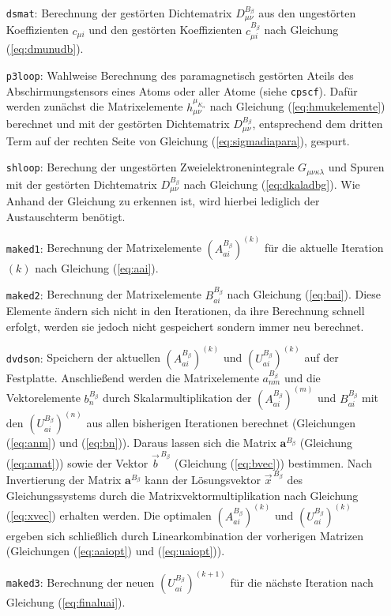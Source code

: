 \begin{itemize}[leftmargin=60pt]
\item[\texttt{dsmat}:] Berechnung der gestörten Dichtematrix $D_{\mu\nu}^{B_\beta}$ aus den ungestörten Koeffizienten $c_{\mu i}$ und den gestörten Koeffizienten $c_{\mu i}^{B_\beta}$ nach Gleichung (\ref{eq:dmunudb}).
\item[\texttt{p3loop}:] Wahlweise Berechnung des paramagnetisch gestörten Ateils des Abschirmungstensors eines Atoms oder aller Atome (siehe \texttt{cpscf}). Dafür werden zunächst die Matrixelemente $h_{\mu\nu}^{\mu_{K_\alpha}}$ nach Gleichung (\ref{eq:hmukelemente}) berechnet und mit der gestörten Dichtematrix $D_{\mu\nu}^{B_\beta}$, entsprechend dem dritten Term auf der rechten Seite von Gleichung (\ref{eq:sigmadiapara}), gespurt.
\item[\texttt{shloop}:] Berechung der ungestörten Zweielektronenintegrale $G_{\mu\nu\kappa\lambda}$ und Spuren mit der gestörten Dichtematrix $D_{\mu\nu}^{B_\beta}$ nach Gleichung (\ref{eq:dkaladbg}). Wie Anhand der Gleichung zu erkennen ist, wird hierbei lediglich der Austauschterm benötigt.
\item[\texttt{maked1}:] Berechnung der Matrixelemente $\left(A_{ai}^{B_\beta}\right)^{(k)}$ für die aktuelle Iteration $(k)$ nach Gleichung (\ref{eq:aai}).
\item[\texttt{maked2}:] Berechnung der Matrixelemente $B_{ai}^{B_\beta}$ nach Gleichung (\ref{eq:bai}). Diese Elemente ändern sich nicht in den Iterationen, da ihre Berechnung schnell erfolgt, werden sie jedoch nicht gespeichert sondern immer neu berechnet. 
\item[\texttt{dvdson}:] Speichern der aktuellen $\left(A_{ai}^{B_\beta}\right)^{(k)}$ und $\left(U_{ai}^{B_\beta}\right)^{(k)}$ auf der Festplatte. Anschließend werden die Matrixelemente $a_{nm}^{B_\beta}$ und die Vektorelemente $b_{n}^{B_\beta}$ durch Skalarmultiplikation der $\left(A_{ai}^{B_\beta}\right)^{(m)}$ und $B_{ai}^{B_\beta}$ mit den $\left(U_{ai}^{B_\beta}\right)^{(n)}$ aus allen bisherigen Iterationen berechnet (Gleichungen (\ref{eq:anm}) und (\ref{eq:bn})). Daraus lassen sich die Matrix $\boldsymbol{a}^{B_\beta}$ (Gleichung (\ref{eq:amat})) sowie der Vektor $\vec{b}^{\,B_\beta}$ (Gleichung (\ref{eq:bvec})) bestimmen. Nach Invertierung der Matrix $\boldsymbol{a}^{B_\beta}$ kann der Lösungsvektor $\vec{x}^{\,B_\beta}$ des Gleichungssystems durch die Matrixvektormultiplikation nach Gleichung (\ref{eq:xvec}) erhalten werden. Die optimalen $\left(A_{ai}^{B_\beta}\right)^{(k)}$ und $\left(U_{ai}^{B_\beta}\right)^{(k)}$ ergeben sich schließlich durch Linearkombination der vorherigen Matrizen (Gleichungen (\ref{eq:aaiopt}) und (\ref{eq:uaiopt})).
\item[\texttt{maked3}:] Berechnung der neuen $\left(U_{ai}^{B_\beta}\right)^{(k+1)}$ für die nächste Iteration nach Gleichung (\ref{eq:finaluai}).
\end{itemize}

